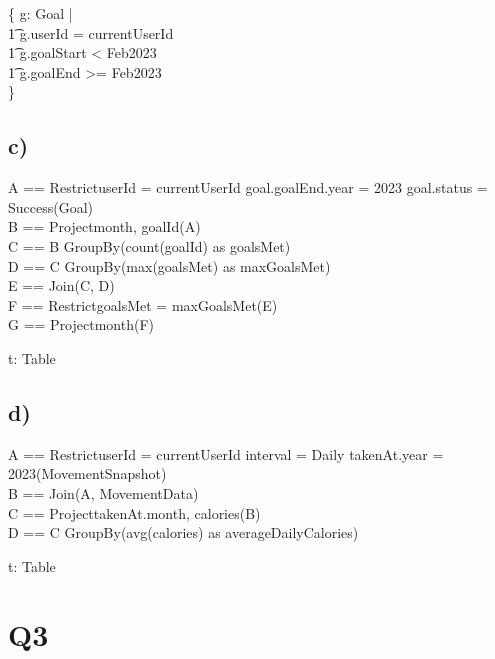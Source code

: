 \documentclass{article}
\begin{document}
\begin{zed}
\{ g: Goal | \\
    \t1 g.userId = currentUserId \land \\
    \t1 g.goalStart < Feb2023 \land \\
    \t1 g.goalEnd >= Feb2023 \\
\}
\end{zed}

\subsection*{\small c)}

\begin{zed}
A == Restrict\small{userId = currentUserId \land goal.goalEnd.year = 2023 \land goal.status = Success}(Goal) \\
B == Project\small{month, goalId}(A) \\
C == B GroupBy(count(goalId) as goalsMet) \\
D == C GroupBy(max(goalsMet) as maxGoalsMet) \\
E == Join(C, D) \\
F == Restrict\small{goalsMet = maxGoalsMet}(E) \\ 
G == Project\small{month}(F)
\end{zed}

\begin{zed}
\forall t: Table
\end{zed}

\subsection*{\small d)}

\begin{zed}
A == Restrict{userId = currentUserId \land interval = Daily \land takenAt.year = 2023}(MovementSnapshot) \\
B == Join(A, MovementData) \\ 
C == Project{takenAt.month, calories}(B) \\ 
D == C GroupBy(avg(calories) as averageDailyCalories) \\
\end{zed}

\begin{zed}
\forall t: Table
\end{zed}

\pagebreak 
\section*{Q3}
\end{document}
